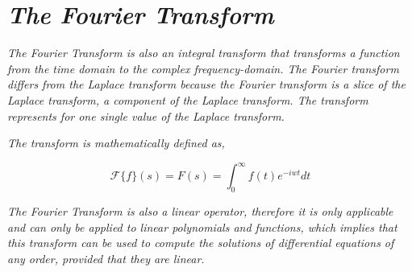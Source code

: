 

\section{\textit{The Fourier Transform}}

	\textit{The Fourier Transform is also an integral transform that transforms a function from the time domain to the complex frequency-domain. The Fourier transform differs from the Laplace transform because the Fourier transform is a slice of the Laplace transform, a component of the Laplace transform. The transform represents for one single value of the Laplace transform.}

	\textit{The transform is mathematically defined as,}

		$$\mathcal{F}\{f\}(s) = F(s) = \int_0^{\infty}f(t)e^{-iwt} dt$$

	\textit{The Fourier Transform is also a linear operator, therefore it is only applicable and can only be applied to linear polynomials and functions, which implies that this transform can be used to compute the solutions of differential equations of any order, provided that they are linear.}

